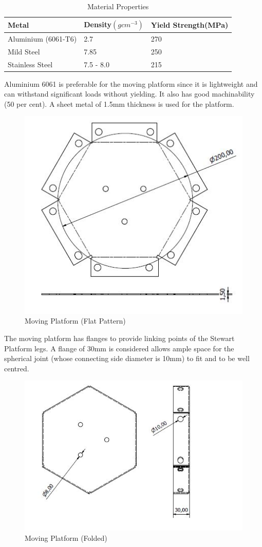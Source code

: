 \begin{center}
\begin{table}[!h]
	\caption[Sheet Metal Properties]{Material Properties}
	\label{table1}
\centering
\begin{tabular}{|l|l|l|}
\hline
\textbf{Metal} & \textbf{Density$(gcm^{-3})$} & \textbf{Yield Strength(MPa)}\\
\hline
Aluminium (6061-T6)& 2.7 & 270\\
\hline
Mild Steel & 7.85 & 250\\
\hline
Stainless Steel & 7.5 - 8.0 & 215\\
\hline
\end{tabular}
\end{table}
\end{center}
Aluminium 6061 is preferable for the moving platform since it is lightweight and can withstand significant loads without yielding. It also has good machinability (50 per cent). A sheet metal of 1.5mm thickness is used for the platform.
\begin{center}
	\begin{figure}[H]
	\centering
	\includegraphics[width=0.6\linewidth]{Figures/Flat}
	\caption[Moving Platform]{Moving Platform (Flat Pattern)}
	\end{figure}
\end{center}

The moving platform has flanges to provide linking points of the Stewart Platform legs. A flange of 30mm is considered allows ample space for the spherical joint (whose connecting side diameter is 10mm) to fit and to be well centred.
\begin{center}
	\begin{figure}[H]
	\centering
	\includegraphics[width=0.6\linewidth]{Figures/Folded}
	\caption[Moving Platform]{Moving Platform (Folded)}
	\end{figure}
\end{center}

